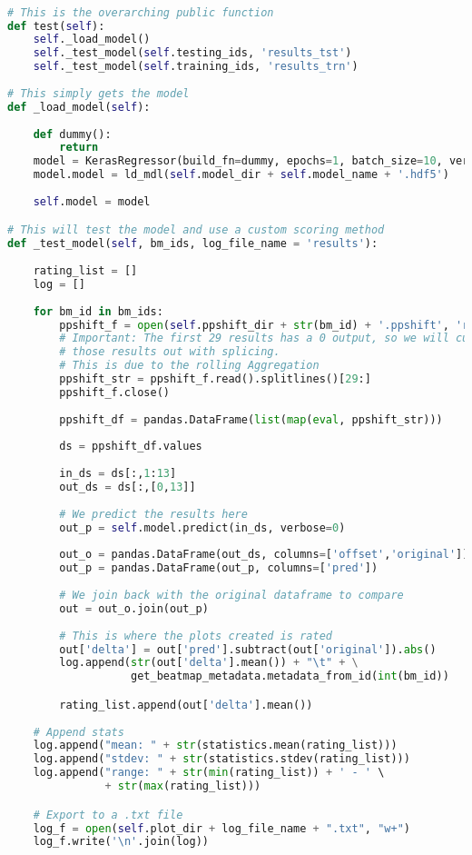 \begin{lstlisting}[language=Python]

# This is the overarching public function
def test(self):
    self._load_model()
    self._test_model(self.testing_ids, 'results_tst')
    self._test_model(self.training_ids, 'results_trn')
    
# This simply gets the model
def _load_model(self):
    
    def dummy():
        return
    model = KerasRegressor(build_fn=dummy, epochs=1, batch_size=10, verbose=1)
    model.model = ld_mdl(self.model_dir + self.model_name + '.hdf5')
    
    self.model = model

# This will test the model and use a custom scoring method
def _test_model(self, bm_ids, log_file_name = 'results'):
    
    rating_list = []
    log = []
    
    for bm_id in bm_ids:
        ppshift_f = open(self.ppshift_dir + str(bm_id) + '.ppshift', 'r')
        # Important: The first 29 results has a 0 output, so we will cut
        # those results out with splicing.
        # This is due to the rolling Aggregation
        ppshift_str = ppshift_f.read().splitlines()[29:]
        ppshift_f.close()
        
        ppshift_df = pandas.DataFrame(list(map(eval, ppshift_str)))
        
        ds = ppshift_df.values
        
        in_ds = ds[:,1:13]
        out_ds = ds[:,[0,13]]
        
        # We predict the results here
        out_p = self.model.predict(in_ds, verbose=0)
        
        out_o = pandas.DataFrame(out_ds, columns=['offset','original'])
        out_p = pandas.DataFrame(out_p, columns=['pred'])
        
        # We join back with the original dataframe to compare
        out = out_o.join(out_p)
        
        # This is where the plots created is rated
        out['delta'] = out['pred'].subtract(out['original']).abs()
        log.append(str(out['delta'].mean()) + "\t" + \
                   get_beatmap_metadata.metadata_from_id(int(bm_id))

        rating_list.append(out['delta'].mean())
        
    # Append stats
    log.append("mean: " + str(statistics.mean(rating_list)))
    log.append("stdev: " + str(statistics.stdev(rating_list)))
    log.append("range: " + str(min(rating_list)) + ' - ' \
               + str(max(rating_list))) 

    # Export to a .txt file
    log_f = open(self.plot_dir + log_file_name + ".txt", "w+")
    log_f.write('\n'.join(log))
\end{lstlisting}
